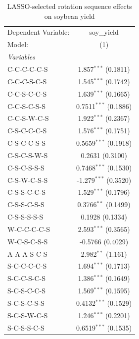 
\begin{table}[htbp]
   \caption{\label{tab:soy_lasso} LASSO-selected rotation sequence effects on soybean yield}
   \centering
   \begin{tabular}{lc}
      \tabularnewline \midrule \midrule
      Dependent Variable: & soy\_yield\\   
      Model:              & (1)\\  
      \midrule
      \emph{Variables}\\
      C-C-C-C-C-S         & 1.857$^{***}$ (0.1811)\\   
      C-C-C-S-C-S         & 1.545$^{***}$ (0.1742)\\   
      C-C-S-C-C-S         & 1.639$^{***}$ (0.1665)\\   
      C-C-S-C-S-S         & 0.7511$^{***}$ (0.1886)\\   
      C-C-S-W-C-S         & 1.922$^{***}$ (0.2367)\\   
      C-S-C-C-C-S         & 1.576$^{***}$ (0.1751)\\   
      C-S-C-C-S-S         & 0.5659$^{***}$ (0.1918)\\   
      C-S-C-S-W-S         & 0.2631 (0.3100)\\   
      C-S-C-S-S-S         & 0.7468$^{***}$ (0.1530)\\   
      C-S-W-C-S-S         & -1.279$^{***}$ (0.3520)\\   
      C-S-S-C-C-S         & 1.529$^{***}$ (0.1796)\\   
      C-S-S-C-S-S         & 0.3766$^{**}$ (0.1499)\\   
      C-S-S-S-S-S         & 0.1928 (0.1334)\\   
      W-C-C-C-C-S         & 2.593$^{***}$ (0.3565)\\   
      W-C-S-C-S-S         & -0.5766 (0.4029)\\   
      A-A-A-S-C-S         & 2.982$^{**}$ (1.161)\\   
      S-C-C-C-C-S         & 1.694$^{***}$ (0.1713)\\   
      S-C-C-S-C-S         & 1.386$^{***}$ (0.1649)\\   
      S-C-S-C-C-S         & 1.569$^{***}$ (0.1595)\\   
      S-C-S-C-S-S         & 0.4132$^{***}$ (0.1529)\\   
      S-C-S-W-C-S         & 1.246$^{***}$ (0.2201)\\   
      S-C-S-S-C-S         & 0.6519$^{***}$ (0.1535)\\   

\end{tabular}
\end{table}
